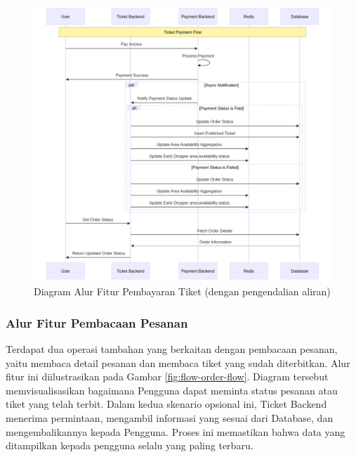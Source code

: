\begin{figure}[H]
    \centering
    \includegraphics[width=1\textwidth]{resources/chapter-3/order-payment-fc.png}
    \caption{Diagram Alur Fitur Pembayaran Tiket (dengan pengendalian aliran)}
    \label{fig:flow-order-payment-fc}
\end{figure}

\subsubsection{Alur Fitur Pembacaan Pesanan}

Terdapat dua operasi tambahan yang berkaitan dengan pembacaan pesanan, yaitu membaca detail pesanan dan membaca tiket yang sudah diterbitkan. Alur fitur ini diilustrasikan pada Gambar \ref{fig:flow-order-flow}. Diagram tersebut memvisualisasikan bagaimana Pengguna dapat meminta status pesanan atau tiket yang telah terbit. Dalam kedua skenario opsional ini, Ticket Backend menerima permintaan, mengambil informasi yang sesuai dari Database, dan mengembalikannya kepada Pengguna. Proses ini memastikan bahwa data yang ditampilkan kepada pengguna selalu yang paling terbaru.

